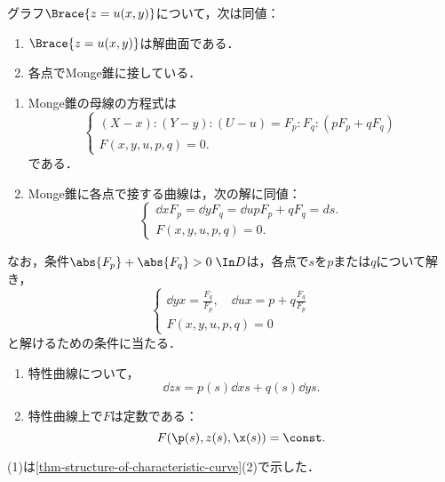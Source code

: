 \documentclass[uplatex,dvipdfmx]{jsreport}
\begin{document}
\begin{lemma}
    グラフ$\Brace{z=u(x,y)}$について，次は同値：
    \begin{enumerate}
        \item $\Brace{z=u(x,y)}$は解曲面である．
        \item 各点でMonge錐に接している．
    \end{enumerate}
\end{lemma}


\begin{lemma}\mbox{}
    \begin{enumerate}
        \item Monge錐の母線の方程式は
        \[\begin{cases}
            (X-x):(Y-y):(U-u)=F_p:F_q:(pF_p+qF_q)\\
            F(x,y,u,p,q)=0.
        \end{cases}\]
        である．
        \item Monge錐に各点で接する曲線は，次の解に同値：
        \[\begin{cases}
            \dd{x}{F_p}=\dd{y}{F_q}=\dd{u}{pF_p+qF_q}=ds.\\
            F(x,y,u,p,q)=0.
        \end{cases}\]
    \end{enumerate}
    なお，条件$\abs{F_p}+\abs{F_q}>0\;\In D$は，各点で$s$を$p$または$q$について解き，
    \[\begin{cases}
        \dd{y}{x}=\frac{F_q}{F_p},\quad\dd{u}{x}=p+q\frac{F_q}{F_p}\\
        F(x,y,u,p,q)=0
    \end{cases}\]
    と解けるための条件に当たる．
\end{lemma}

\begin{theorem}\mbox{}
    \begin{enumerate}
        \item 特性曲線について，
        \[\dd{z}{s}=p(s)\dd{x}{s}+q(s)\dd{y}{s}.\]
        \item 特性曲線上で$F$は定数である：
        \[F(\p(s),z(s),\x(s))=\const.\]
    \end{enumerate}
\end{theorem}
\begin{Proof}
    (1)は\ref{thm-structure-of-characteristic-curve}(2)で示した．
\end{Proof}
\end{document}
